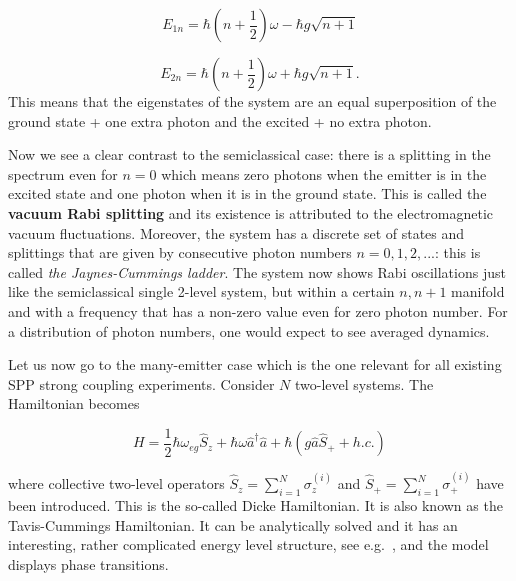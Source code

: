\documentclass[12pt]{iopart}
\begin{document}
\begin{equation}
E_{1n}=\hbar\left(n+\frac{1}{2}\right)\omega - \hbar g\sqrt{n+1}\label{eq:70}\end{equation}

\begin{equation}
E_{2n}=\hbar\left(n+\frac{1}{2}\right)\omega+\hbar g\sqrt{n+1}.\label{eq:70}\end{equation}
This means that the eigenstates of the system are an equal superposition of the ground state + one extra photon and the excited + no extra photon.

Now we see a clear contrast to the semiclassical case: there is a splitting in the spectrum even for $n=0$ which means zero photons when the emitter is in the excited state and one photon when it is in the ground state. This is called the {\bf vacuum Rabi splitting} and its existence is attributed to the electromagnetic vacuum fluctuations. Moreover, the system has a discrete set of states and splittings that are given by consecutive photon numbers $n = 0, 1, 2, ...$: this is called {\it the Jaynes-Cummings ladder}. The system now shows Rabi oscillations just like the semiclassical single 2-level system, but within a certain $n,n+1$ manifold and with a frequency that has a non-zero value even for zero photon number. For a distribution of photon numbers, one would expect to see averaged dynamics.

Let us now go to the many-emitter case which is the one relevant for all existing SPP strong coupling experiments. Consider $N$ two-level systems. The Hamiltonian becomes

\begin{equation}
H=\frac{1}{2}\hbar\omega_{eg}\hat{S}_{z}+\hbar\omega\hat{a}^{\dagger} \hat{a}+\hbar\left(g\hat{a}\hat{S}_{+}+h.c.\right)\label{DickePT}
\end{equation}

\noindent where collective two-level operators $\hat{S}_{z}= \sum_{i=1}^N \sigma^{(i)}_{z}$ and $\hat{S}_{+}=\sum_{i=1}^N \sigma^{(i)}_{+}$ have been introduced. This is the so-called Dicke Hamiltonian. It is also known as the Tavis-Cummings Hamiltonian. It can be analytically solved and it has an interesting, rather complicated energy level structure, see e.g.\ \cite{Garraway2011}, and the model displays phase transitions.
\end{document}
